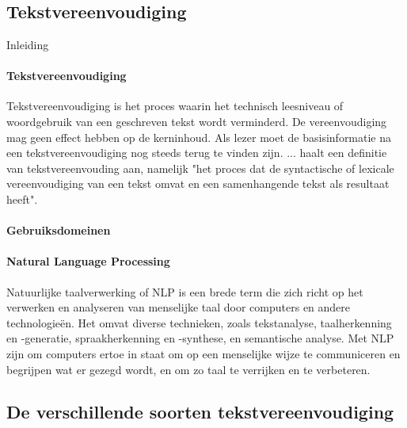 \chapter{}%
\label{ch:stand-van-zaken}

\section{Tekstvereenvoudiging}

Inleiding

\subsubsection{Tekstvereenvoudiging}

Tekstvereenvoudiging is het proces waarin het technisch leesniveau of woordgebruik van een geschreven tekst wordt verminderd. De vereenvoudiging mag geen effect hebben op de kerninhoud. Als lezer moet de basisinformatie na een tekstvereenvoudiging nog steeds terug te vinden zijn. ... haalt een definitie van tekstvereenvouding aan, namelijk "het proces dat de syntactische of lexicale vereenvoudiging van een tekst omvat en een samenhangende tekst als resultaat heeft". 


\subsubsection{Gebruiksdomeinen}


\subsubsection{Natural Language Processing}

Natuurlijke taalverwerking of NLP is een brede term die zich richt op het verwerken en analyseren van menselijke taal door computers en andere technologieën. Het omvat diverse technieken, zoals tekstanalyse, taalherkenning en -generatie, spraakherkenning en -synthese, en semantische analyse. Met NLP zijn om computers ertoe in staat om op een menselijke wijze te communiceren en begrijpen wat er gezegd wordt, en om zo taal te verrijken en te verbeteren.

\section{De verschillende soorten tekstvereenvoudiging}

